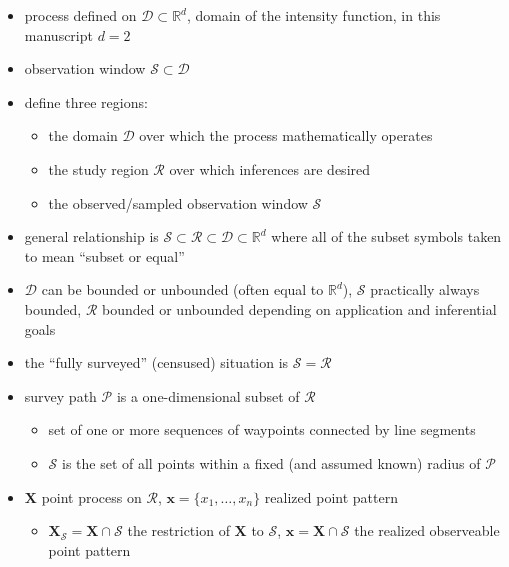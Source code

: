 \documentclass[review]{elsarticle}
\begin{document}
\begin{itemize}

\item process defined on \(\mathcal{D} \subset \mathbb{R}^{d}\), domain of the
intensity function, in this manuscript \(d = 2\)

\item observation window \(\mathcal{S} \subset \mathcal{D}\)

\item define three regions:
\begin{itemize}
\item the domain \(\mathcal{D}\) over which the process mathematically operates
\item the study region \(\mathcal{R}\) over which inferences are desired
\item the observed/sampled observation window \(\mathcal{S}\)
\end{itemize}

\item general relationship is \(\mathcal{S} \subset \mathcal{R}
\subset \mathcal{D} \subset \mathbb{R}^{d}\) where all of the subset symbols
taken to mean ``subset or equal''

\item \(\mathcal{D}\) can be bounded or unbounded (often equal to
\(\mathbb{R}^{d}\)), $\mathcal{S}$ practically always bounded, \(\mathcal{R}\)
bounded or unbounded depending on application and inferential goals

\item the ``fully surveyed'' (censused) situation is
\(\mathcal{S} = \mathcal{R}\)

\item survey path \(\mathcal{P}\) is a one-dimensional subset of
\(\mathcal{R}\)
\begin{itemize}
\item set of one or more sequences of waypoints connected by line segments
\item \(\mathcal{S}\) is the set of all points within a fixed (and assumed
known) radius of \(\mathcal{P}\)
\end{itemize}

\item \(\mathbf{X}\) point process on \(\mathcal{R}\), \(\mathbf{x} = \{x_{1},
\dots, x_{n}\}\) realized point pattern
\begin{itemize}
\item \(\mathbf{X}_{\mathcal{S}} = \mathbf{X} \cap \mathcal{S}\) the
 restriction of \(\mathbf{X}\) to \(\mathcal{S}\), \(\mathbf{x} = \mathbf{X}
\cap \mathcal{S}\) the realized observeable point pattern
\end{itemize}


\end{itemize}
\end{document}
